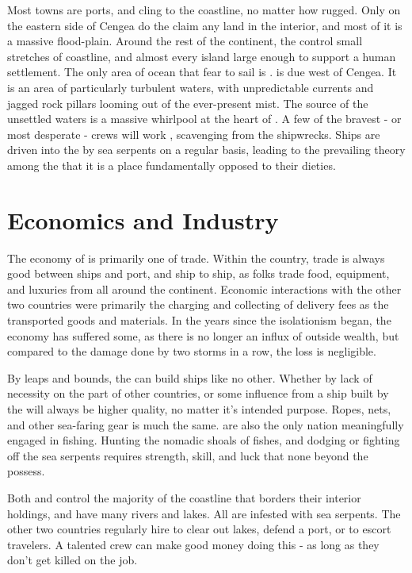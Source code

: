 \documentclass[blue]{GL2020}
\begin{document}
Most \pShip{} towns are ports, and cling to the coastline, no matter how rugged. Only on the eastern side of Cengea do the \pShippies{} claim any land in the interior, and most of it is a massive flood-plain. Around the rest of the continent, the \pShip{} control small stretches of coastline, and almost every island large enough to support a human settlement. The only area of ocean that \pShippies{} fear to sail is \pWod{}. \pWod{} is due west of Cengea. It is an area of particularly turbulent waters, with unpredictable currents and jagged rock pillars looming out of the ever-present mist. The source of the unsettled waters is a massive whirlpool at the heart of \pWod{}. A few of the bravest - or most desperate - crews will work \pWod{}, scavenging from the shipwrecks. Ships are driven into the \pWod{} by sea serpents on a regular basis, leading to the prevailing theory among the \pShippies{} that it is a place fundamentally opposed to their dieties.

\section*{Economics and Industry}
The economy of \pShip{} is primarily one of trade. Within the country, trade is always good between ships and port, and ship to ship, as folks trade food, equipment, and luxuries from all around the continent. Economic interactions with the other two countries were primarily the charging and collecting of delivery fees as the \pShippies{} transported goods and materials. In the years since the isolationism began, the economy has suffered some, as there is no longer an influx of outside wealth, but compared to the damage done by two storms in a row, the loss is negligible.

By leaps and bounds, the \pShippies{} can build ships like no other. Whether by lack of necessity on the part of other countries, or some influence from \cEbbFull{} a ship built by the \pShippies{} will always be higher quality, no matter it's intended purpose. Ropes, nets, and other sea-faring gear is much the same. \pShippies{} are also the only nation meaningfully engaged in fishing. Hunting the nomadic shoals of fishes, and dodging or fighting off the sea serpents requires strength, skill, and luck that none beyond the \pShippies{} possess.

Both \pFarm{} and \pTech{} control the majority of the coastline that borders their interior holdings, and \pFarm{} have many rivers and lakes. All are infested with sea serpents. The other two countries regularly hire \pShippies{} to clear out lakes, defend a port, or to escort travelers. A talented crew can make good money doing this - as long as they don't get killed on the job.
\end{document}

